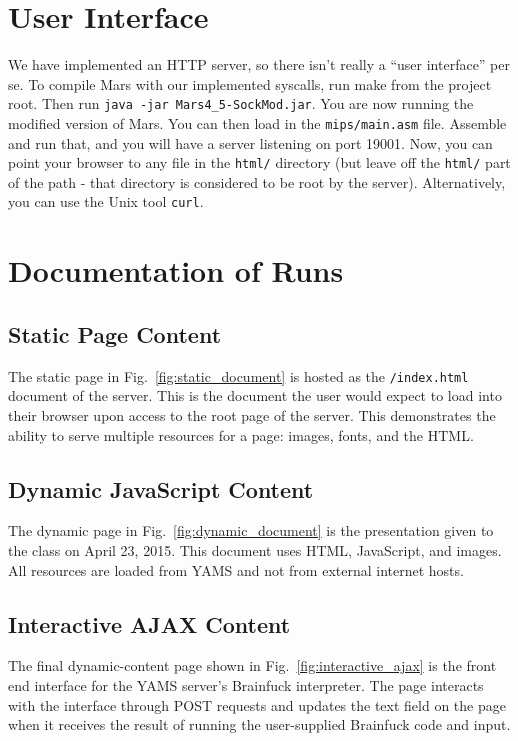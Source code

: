 \documentclass[journal,10pt]{IEEEtran}
\begin{document}
\section{User Interface}

We have implemented an HTTP server, so there isn't really a ``user interface''
per se. To compile Mars with our implemented syscalls, run make from the project
root. Then run \texttt{java -jar Mars4\_5-SockMod.jar}. You are now running the
modified version of Mars. You can then load in the \texttt{mips/main.asm} file.
Assemble and run that, and you will have a server listening on port 19001. Now,
you can point your browser to any file in the \texttt{html/} directory (but
leave off the \texttt{html/} part of the path - that directory is considered to
be root by the server). Alternatively, you can use the Unix tool \texttt{curl}.

\section{Documentation of Runs}

\subsection{Static Page Content}

The static page in Fig.~\ref{fig:static_document} is hosted as the
\texttt{/index.html} document of the server. This is the document the user would
expect to load into their browser upon access to the root page of the server.
This demonstrates the ability to serve multiple resources for a page: images,
fonts, and the HTML.

\subsection{Dynamic JavaScript Content}

The dynamic page in Fig.~\ref{fig:dynamic_document} is the presentation given to
the class on April 23, 2015. This document uses HTML, JavaScript, and images.
All resources are loaded from YAMS and not from external internet hosts.

\subsection{Interactive AJAX Content}

The final dynamic-content page shown in Fig.~\ref{fig:interactive_ajax} is the
front end interface for the YAMS server's Brainfuck\cite{Mpreu/preller}
interpreter. The page interacts with the interface through POST requests and
updates the text field on the page when it receives the result of running the
user-supplied Brainfuck code and input.
\end{document}
